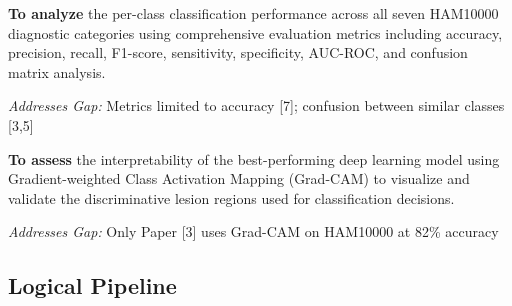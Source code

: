 \documentclass[11pt,a4paper]{article}
\begin{document}
\begin{objectivebox}
\textbf{To analyze} the per-class classification performance across all seven HAM10000 diagnostic categories using comprehensive evaluation metrics including accuracy, precision, recall, F1-score, sensitivity, specificity, AUC-ROC, and confusion matrix analysis.

\smallskip
\textit{Addresses Gap:} Metrics limited to accuracy [7]; confusion between similar classes [3,5]
\end{objectivebox}

\begin{objectivebox}
\textbf{To assess} the interpretability of the best-performing deep learning model using Gradient-weighted Class Activation Mapping (Grad-CAM) to visualize and validate the discriminative lesion regions used for classification decisions.

\smallskip
\textit{Addresses Gap:} Only Paper [3] uses Grad-CAM on HAM10000 at 82\% accuracy
\end{objectivebox}

\subsection{Logical Pipeline}

\begin{center}
\end{center}
\end{document}
